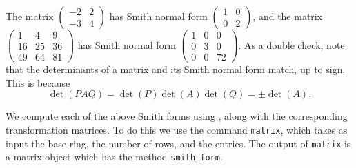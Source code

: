 \begin{example}
The matrix $\begin{pmatrix} -2 & 2 \\ -3 & 4 \end{pmatrix}$ has Smith normal form
$\begin{pmatrix} 1 & 0 \\ 0 & 2 \end{pmatrix}$,
and the matrix
$\begin{pmatrix} 1 & 4 & 9 \\ 16 & 25 & 36 \\ 49 & 64 & 81 \end{pmatrix}$
has Smith normal form
$\begin{pmatrix} 1 & 0 & 0 \\ 0 & 3 & 0 \\ 0 & 0 & 72 \end{pmatrix}$.
As a double check, note that the determinants of a matrix and its
Smith normal form match, up to sign. This is because
$$\det(PAQ) = \det(P)\det(A)\det(Q) = \pm \det(A).$$

We compute each of the above Smith forms using {\Sage},
along with the corresponding transformation matrices.
To do this we use the {\Sage} command {\tt matrix},
which takes as input the base ring, the number
of rows, and the entries. The output of {\tt matrix}
is a matrix object which has the method {\tt smith\_form}.


\end{example}
